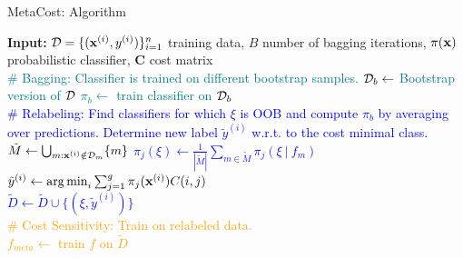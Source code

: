 \documentclass[11pt,compress,t,notes=noshow, xcolor=table]{beamer}
\begin{document}
\begin{vbframe}{MetaCost: Algorithm}
	
		

		
			\begin{algorithmic}
				
				\footnotesize
%				
				\State \textbf{Input:} 
				$\mathcal{D} = \{(\mathbf{x}^{(i)},y^{(i)})\}_{i=1}^n$ training data, $B$ number of bagging iterations,
				$\pi(\mathbf{x})$ probabilistic classifier,
				$\mathbf{C}$ cost matrix \\
				 \textcolor{teal}{\# Bagging: Classifier is trained on different bootstrap samples.
    \State $\mathcal{D}_b \leftarrow $ Bootstrap version of $\mathcal{D}$
    \State $\pi_b \leftarrow $ train classifier on $\mathcal{D}_b$ 
\EndFor 
\\
\textcolor{blue}{\# Relabeling: Find classifiers for which $\xi$ is OOB and compute $\pi_b$ by averaging over predictions.
Determine new label $\tilde y^{(i)}$ w.r.t. to the cost minimal class.
 	 \State $\tilde M \leftarrow \bigcup_{m: \mathbf{x}^{(i)} \notin \mathcal{D}_m} \{m\}$ 
\EndFor
{} 
    \State $\pi_j(\xi)  \leftarrow \frac{1}{|\tilde M| } \sum_{m \in \tilde M}   \pi_j(\xi~|~ f_m) $
\EndFor
\\
$\tilde y^{(i)} \leftarrow \operatorname{arg\,min}_{i} \sum_{j=1}^g \pi_j(\mathbf{x}^{(i)}) C(i,j) $\\
$\tilde D \leftarrow \tilde D \cup \{(\xi,\tilde y^{(i)})\} $
}}  
\\
\textcolor{orange}{\# Cost Sensitivity: Train on relabeled data.\\
$f_{meta} \leftarrow$ train $f$ on $\tilde D$}
\end{algorithmic}

\end{vbframe}

\endlecture
\end{document}
